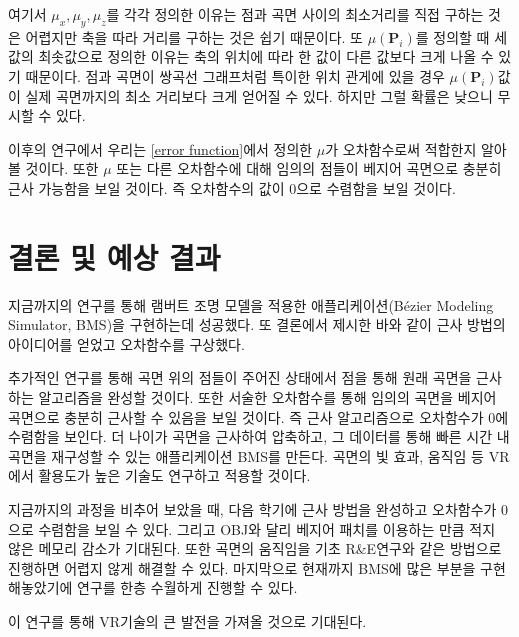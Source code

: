 \documentclass[10pt]{gshs-report-v2.0}
\theoremstyle{theorem}
\theoremstyle{lemma}
\theoremstyle{definition}
\begin{document}
여기서 $\mu_x, \mu_y, \mu_z$를 각각 정의한 이유는 점과 곡면 사이의 최소거리를 직접 구하는 것은 어렵지만 축을 따라 거리를 구하는 것은 쉽기 때문이다. 또 $\mu(\mathbf{P}_i)$를 정의할 때 세 값의 최솟값으로 정의한 이유는 축의 위치에 따라 한 값이 다른 값보다 크게 나올 수 있기 때문이다. 점과 곡면이 쌍곡선 그래프처럼 특이한 위치 관게에 있을 경우 $\mu(\mathbf{P}_i)$값이 실제 곡면까지의 최소 거리보다 크게 얻어질 수 있다. 하지만 그럴 확률은 낮으니 무시할 수 있다.

이후의 연구에서 우리는 \cref{error function}에서 정의한 $\mu$가 오차함수로써 적합한지 알아볼 것이다. 또한 $\mu$ 또는 다른 오차함수에 대해 임의의 점들이 베지어 곡면으로 충분히 근사 가능함을 보일 것이다. 즉 오차함수의 값이 0으로 수렴함을 보일 것이다. 

\section{결론 및 예상 결과}
지금까지의 연구를 통해 램버트 조명 모델을 적용한 애플리케이션(Bézier Modeling Simulator, BMS)을 구현하는데 성공했다. 또 결론에서 제시한 바와 같이 근사 방법의 아이디어를 얻었고 오차함수를 구상했다. 

추가적인 연구를 통해 곡면 위의 점들이 주어진 상태에서 점을 통해 원래 곡면을 근사하는 알고리즘을 완성할 것이다. 또한 서술한 오차함수를 통해 임의의 곡면을 베지어 곡면으로 충분히 근사할 수 있음을 보일 것이다. 즉 근사 알고리즘으로 오차함수가 0에 수렴함을 보인다. 더 나이가 곡면을 근사하여 압축하고, 그 데이터를 통해 빠른 시간 내 곡면을 재구성할 수 있는 애플리케이션 BMS를 만든다. 곡면의 빛 효과, 움직임 등 VR에서 활용도가 높은 기술도 연구하고 적용할 것이다.

지금까지의 과정을 비추어 보았을 때, 다음 학기에 근사 방법을 완성하고 오차함수가 0으로 수렴함을 보일 수 있다. 그리고 OBJ와 달리 베지어 패치를 이용하는 만큼 적지 않은 메모리 감소가 기대된다. 또한 곡면의 움직임을 기초 R\&E연구와 같은 방법으로 진행하면 어렵지 않게 해결할 수 있다. 마지막으로 현재까지 BMS에 많은 부분을 구현해놓았기에 연구를 한층 수월하게 진행할 수 있다. 

이 연구를 통해 VR기술의 큰 발전을 가져올 것으로 기대된다. \\


\noindent{}

\end{document}
